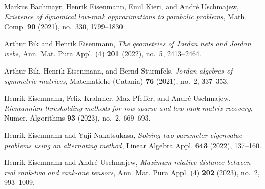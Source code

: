 \documentclass[a4paper,11pt]{amsart}
\begin{document}
\begin{thebibliography}{1}

    Markus Bachmayr, Henrik Eisenmann, Emil Kieri, and Andr\'{e} Uschmajew, \emph{Existence of dynamical low-rank approximations to parabolic problems}, Math. Comp. \textbf{90} (2021), no.~330, 1799--1830.
    
    Arthur Bik and Henrik Eisenmann, \emph{The geometries of {J}ordan nets and {J}ordan webs}, Ann. Mat. Pura Appl. (4) \textbf{201} (2022), no.~5, 2413--2464.
    
    Arthur Bik, Henrik Eisenmann, and Bernd Sturmfels, \emph{Jordan algebras of symmetric matrices}, Matematiche (Catania) \textbf{76} (2021), no.~2, 337--353.
    
    Henrik Eisenmann, Felix Krahmer, Max Pfeffer, and Andr\'{e} Uschmajew, \emph{Riemannian thresholding methods for row-sparse and low-rank matrix recovery}, Numer. Algorithms \textbf{93} (2023), no.~2, 669--693.
    
    Henrik Eisenmann and Yuji Nakatsukasa, \emph{Solving two-parameter eigenvalue problems using an alternating method}, Linear Algebra Appl. \textbf{643} (2022), 137--160.
    
    Henrik Eisenmann and Andr\'{e} Uschmajew, \emph{Maximum relative distance between real rank-two and rank-one tensors}, Ann. Mat. Pura Appl. (4) \textbf{202} (2023), no.~2, 993--1009.
    
\end{thebibliography}
\end{document}
